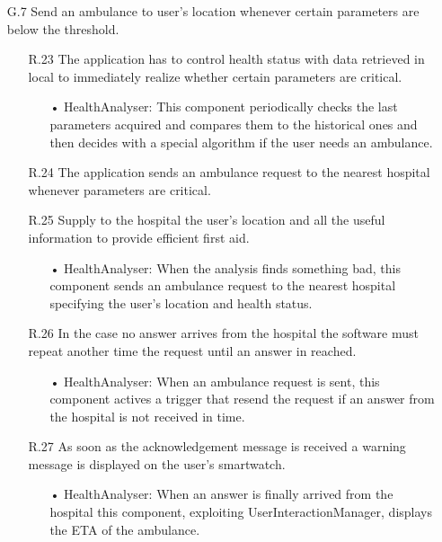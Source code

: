 \begin{enumerate}
\item [G.7] Send an ambulance to user's location whenever certain parameters are below the threshold.
	\begin{enumerate}
	\item [R.23] The application has to control health status with data retrieved in local to immediately realize whether certain parameters are critical.
		\begin{enumerate}
		\item[•] HealthAnalyser: This component periodically checks the last parameters acquired and compares them to the historical ones and then decides with a special algorithm if the user needs an ambulance.
		\end{enumerate}	
	\item [R.24] The application sends an ambulance request to the nearest hospital whenever parameters are critical.
	\item [R.25] Supply to the hospital the user's location and all the useful information to provide efficient first aid.
		\begin{enumerate}
		\item[•] HealthAnalyser: When the analysis finds something bad, this component sends an ambulance request to the nearest hospital specifying the user's location and health status.
		\end{enumerate}	
	\item [R.26] In the case no answer arrives from the hospital the software must repeat another time the request until an answer in reached.
		\begin{enumerate}
		\item[•] HealthAnalyser: When an ambulance request is sent, this component actives a trigger that resend the request if an answer from the hospital is not received in time.
		\end{enumerate}	
	\item [R.27] As soon as the acknowledgement message is received a warning message is displayed on the user's smartwatch.
		\begin{enumerate}
		\item[•] HealthAnalyser: When an answer is finally arrived from the hospital this component, exploiting UserInteractionManager, displays the ETA of the ambulance.
		\end{enumerate}	
	\end{enumerate}
	

\end{enumerate}
